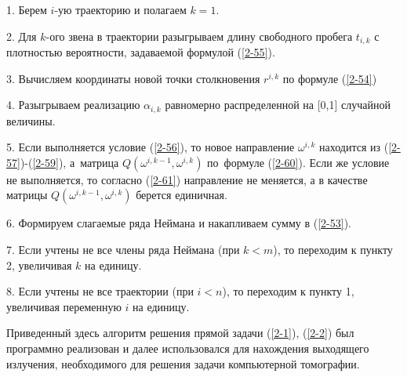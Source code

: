 1. Берем $i$-ую траекторию и полагаем $k=1$.

2. Для $k$-ого звена в траектории разыгрываем длину свободного
пробега $t_{i,k}$ с плотностью вероятности, задаваемой формулой
(\ref{2-55}).

3. Вычисляем координаты новой точки столкновения $r^{i,k}$ по
формуле (\ref{2-54})

4. Разыгрываем реализацию $\alpha_{i,k}$ равномерно распределенной
на [0,1] случайной величины.

5. Если выполняется условие (\ref{2-56}), то новое направление
$\omega^{i,k}$ находится из \;(\ref{2-57})-(\ref{2-59}),\; а\,
матрица\;\; $Q(\omega^{i,k-1},\omega^{i,k})$\;\; по\, формуле\;
(\ref{2-60}).\; Если \;же условие не выполняется, то согласно
(\ref{2-61}) направление не меняется, а в качестве матрицы
$Q(\omega^{i,k-1},\omega^{i,k})$ берется единичная.

6. Формируем слагаемые ряда Неймана и накапливаем сумму в
(\ref{2-53}).


7. Если учтены не все члены ряда Неймана (при $k<m$), то переходим
к пункту 2, увеличивая $k$ на единицу.

8. Если учтены не все траектории  (при $i<n$), то переходим к
пункту 1, увеличивая переменную $i$ на единицу.

Приведенный здесь алгоритм решения прямой задачи (\ref{2-1}),
(\eqref{2-2}) был программно реализован и далее использовался для
нахождения выходящего излучения, необходимого для решения задачи
компьютерной томографии.

